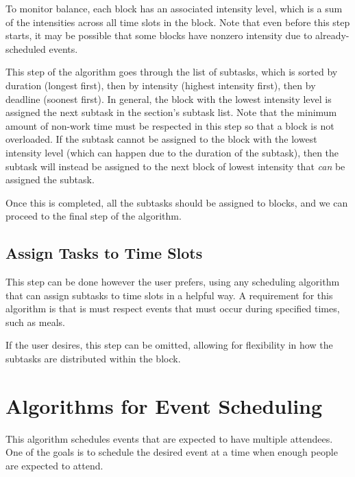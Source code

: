 \documentclass{article}
\begin{document}
		To monitor balance, each block has an associated intensity level, which is a sum of the intensities across all time slots in the block.
		Note that even before this step starts, it may be possible that some blocks have nonzero intensity due to already-scheduled events.
		
		This step of the algorithm goes through the list of subtasks, which is sorted by duration (longest first), then by intensity (highest intensity first), then by deadline (soonest first).
		In general, the block with the lowest intensity level is assigned the next subtask in the section's subtask list.
		Note that the minimum amount of non-work time must be respected in this step so that a block is not overloaded.
		If the subtask cannot be assigned to the block with the lowest intensity level (which can happen due to the duration of the subtask), then the subtask will instead be assigned to the next block of lowest intensity that \emph{can} be assigned the subtask.
		
		Once this is completed, all the subtasks should be assigned to blocks, and we can proceed to the final step of the algorithm.
		
	\subsection{Assign Tasks to Time Slots}
		This step can be done however the user prefers, using any scheduling algorithm that can assign subtasks to time slots in a helpful way.
		A requirement for this algorithm is that is must respect events that must occur during specified times, such as meals.
		
		If the user desires, this step can be omitted, allowing for flexibility in how the subtasks are distributed within the block.
		
		
		
\section{Algorithms for Event Scheduling}
	This algorithm schedules events that are expected to have multiple attendees.
	One of the goals is to schedule the desired event at a time when enough people are expected to attend.
\end{document}
